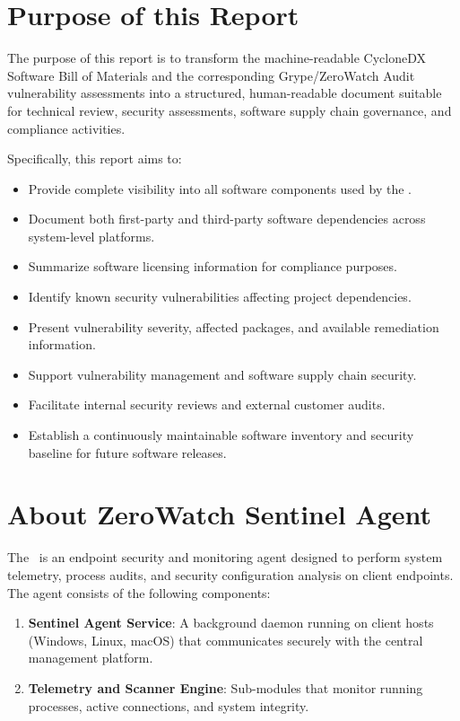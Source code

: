 \section{Purpose of this Report}

The purpose of this report is to transform the machine-readable CycloneDX Software Bill of Materials and the corresponding Grype/ZeroWatch Audit vulnerability assessments into a structured, human-readable document suitable for technical review, security assessments, software supply chain governance, and compliance activities.

Specifically, this report aims to:
\begin{itemize}
\item Provide complete visibility into all software components used by the \ProjectName.
\item Document both first-party and third-party software dependencies across system-level platforms.
\item Summarize software licensing information for compliance purposes.
\item Identify known security vulnerabilities affecting project dependencies.
\item Present vulnerability severity, affected packages, and available remediation information.
\item Support vulnerability management and software supply chain security.
\item Facilitate internal security reviews and external customer audits.
\item Establish a continuously maintainable software inventory and security baseline for future software releases.
\end{itemize}

\vspace{0.4cm}

\section{About ZeroWatch Sentinel Agent}

The \ProjectName\ is an endpoint security and monitoring agent designed to perform system telemetry, process audits, and security configuration analysis on client endpoints. The agent consists of the following components:
\begin{enumerate}
    \item \textbf{Sentinel Agent Service}: A background daemon running on client hosts (Windows, Linux, macOS) that communicates securely with the central management platform.
    \item \textbf{Telemetry and Scanner Engine}: Sub-modules that monitor running processes, active connections, and system integrity.
\end{enumerate}


